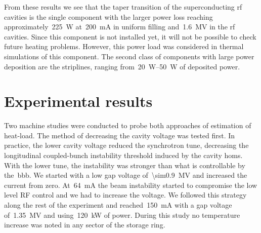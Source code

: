 \documentclass
[
    a4paper,
    biblatex,     %
]{jacow}
\begin{document}
    From these results we see that the taper transition of the superconducting rf cavities is the single component with the larger power loss reaching approximately~\SI{225}{\watt} at~\SI{200}{\milli\ampere} in uniform filling and~\SI{1.6}{\mega\volt} in the rf cavities. Since this component is not installed yet, it will not be possible to check future heating problems. However, this power load was considered in thermal simulations of this component. The second class of components with large power deposition are the striplines, ranging from~\SIrange{20}{50}{\watt} of deposited power.

\section{Experimental results}

    Two machine studies were conducted to probe both approaches of estimation of heat-load. The method of decreasing the cavity voltage was tested first. In practice, the lower cavity voltage reduced the synchrotron tune, decreasing the longitudinal coupled-bunch instability threshold induced by the cavity \glspl{hom}. With the lower tune, the instability was stronger than what is controllable by the~\gls{bbb}. We started with a low gap voltage of~\SI{\sim0.9}{\mega\volt} and increased the current from zero. At~\SI{64}{\milli\ampere} the beam instability started to compromise the low level RF control and we had to increase the voltage. We followed this strategy along the rest of the experiment and reached~\SI{150}{\milli\ampere} with a gap voltage of~\SI{1.35}{\mega\volt} and using~\SI{120}{\kilo\watt} of power. During this study no temperature increase was noted in any sector of the storage ring.
    
\end{document}
